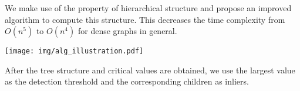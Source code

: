 \documentclass[portrait,final,a1paper,fontscale=0.3]{baposter}
\begin{document}
\begin{poster}
{We make use of the property of hierarchical structure and propose an improved algorithm to compute this structure. This decreases the time complexity from $O(n^5)$ to $O(n^4)$ for dense graphs in general.

{
\hspace{-1em}\texttt{[image: img/alg\_illustration.pdf]}
}

After the tree structure and critical values are obtained, we use the largest value as the detection threshold and the corresponding children as inliers.
}





\end{poster}
\end{document}
